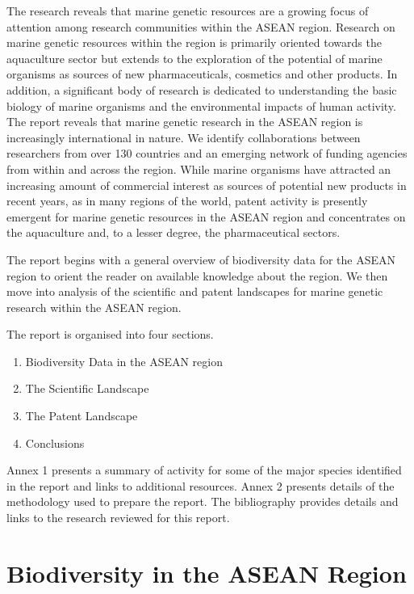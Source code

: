\documentclass[openany]{book}
\providecommand{\tightlist}{%
  \setlength{\itemsep}{0pt}\setlength{\parskip}{0pt}}
\theoremstyle{definition}
\theoremstyle{definition}
\theoremstyle{definition}
\theoremstyle{remark}
\begin{document}
The research reveals that marine genetic resources are a growing focus
of attention among research communities within the ASEAN region.
Research on marine genetic resources within the region is primarily
oriented towards the aquaculture sector but extends to the exploration
of the potential of marine organisms as sources of new pharmaceuticals,
cosmetics and other products. In addition, a significant body of
research is dedicated to understanding the basic biology of marine
organisms and the environmental impacts of human activity. The report
reveals that marine genetic research in the ASEAN region is increasingly
international in nature. We identify collaborations between researchers
from over 130 countries and an emerging network of funding agencies from
within and across the region. While marine organisms have attracted an
increasing amount of commercial interest as sources of potential new
products in recent years, as in many regions of the world, patent
activity is presently emergent for marine genetic resources in the ASEAN
region and concentrates on the aquaculture and, to a lesser degree, the
pharmaceutical sectors.

The report begins with a general overview of biodiversity data for the
ASEAN region to orient the reader on available knowledge about the
region. We then move into analysis of the scientific and patent
landscapes for marine genetic research within the ASEAN region.

The report is organised into four sections.

\begin{enumerate}
\def\labelenumi{\arabic{enumi}.}
\tightlist
\item
  Biodiversity Data in the ASEAN region
\item
  The Scientific Landscape
\item
  The Patent Landscape
\item
  Conclusions
\end{enumerate}

Annex 1 presents a summary of activity for some of the major species
identified in the report and links to additional resources. Annex 2
presents details of the methodology used to prepare the report. The
bibliography provides details and links to the research reviewed for
this report.

\hypertarget{biodiversity}{%
\chapter{Biodiversity in the ASEAN Region}\label{biodiversity}}
\end{document}
